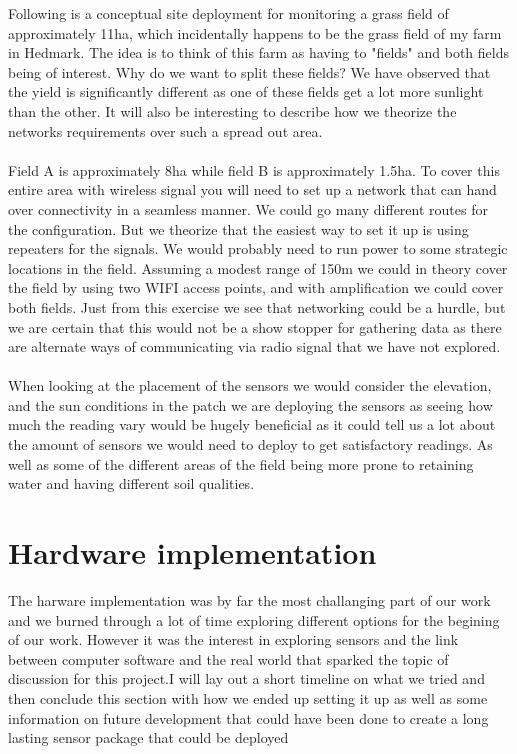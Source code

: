 \documentclass[]{uiophd}
\begin{document}
 Following is a conceptual site deployment for monitoring a grass field of approximately 11ha, which incidentally happens to be the grass field of my farm in Hedmark. The idea is to think of this farm as having to "fields" and both fields being of interest. Why do we want to split these fields? We have observed that the yield is significantly different as one of these fields get a lot more sunlight than the other. It will also be interesting to describe how we theorize the networks requirements over such a spread out area.
 \\\\
 Field A is approximately 8ha while field B is approximately 1.5ha. To cover this entire area with wireless signal you will need to set up a network that can hand over connectivity in a seamless manner. We could go many different routes for the configuration. But we theorize that the easiest way to set it up is using repeaters for the signals. We would probably need to run power to some strategic locations in the field. Assuming a modest range of 150m we could in theory cover the field by using two WIFI access points, and with amplification we could cover both fields. Just from this exercise we see that networking could be a hurdle, but we are certain that this would not be a show stopper for gathering data as there are alternate ways of communicating via radio signal that we have not explored.
 \\\\
 When looking at the placement of the sensors we would consider the elevation, and the sun conditions in the patch we are deploying the sensors as seeing how much the reading vary would be hugely beneficial as it could tell us a lot about the amount of sensors we would need to deploy to get satisfactory readings. As well as some of the different areas of the field being more prone to retaining water and having different soil qualities. 
  
\section{Hardware implementation}
The harware implementation was by far the most challanging part of our work and we burned through a lot of time exploring different options for the begining of our work. However it was the interest in exploring sensors and the link between computer software and the real world that sparked the topic of discussion for this project.I will lay out a short timeline on what we tried and then conclude this section with how we ended up setting it up as well as some information on future development that could have been done to create a long lasting sensor package that could be deployed 
\end{document}

